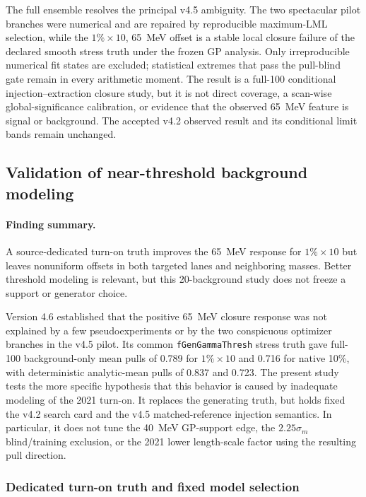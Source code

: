 \clearpage
The full ensemble resolves the principal v4.5 ambiguity.  The two spectacular pilot
branches were numerical and are repaired by reproducible maximum-LML selection, while
the $1\%\times10$, 65~MeV offset is a stable local closure failure of the declared
smooth stress truth under the frozen GP analysis.  Only irreproducible numerical fit
states are excluded; statistical extremes that pass the pull-blind gate remain in every
arithmetic moment.
The result is a full-100 conditional injection--extraction closure study, but it is
not direct \CLs{} coverage, a scan-wise global-significance calibration, or evidence
that the observed 65~MeV feature is signal or background.  The accepted v4.2 observed
result and its conditional limit bands remain unchanged.

\FloatBarrier

\subsection{Validation of near-threshold background modeling}
\label{sec:v4p7-near-threshold-background-modeling}

\paragraph{Finding summary.}
A source-dedicated turn-on truth improves the 65~MeV response for
$1\%\times10$ but leaves nonuniform offsets in both targeted lanes and neighboring
masses.  Better threshold modeling is relevant, but this 20-background study does
not freeze a support or generator choice.

Version 4.6 established that the positive 65~MeV closure response was not
explained by a few pseudoexperiments or by the two conspicuous optimizer
branches in the v4.5 pilot.  Its common \texttt{fGenGammaThresh} stress truth
gave full-100 background-only mean pulls of 0.789 for $1\%\times10$ and 0.716
for native 10\%, with deterministic analytic-mean pulls of 0.837 and 0.723.
The present study tests the more specific hypothesis that this behavior is
caused by inadequate modeling of the 2021 turn-on.  It replaces the generating
truth, but holds fixed the v4.2 search card and the v4.5 matched-reference
injection semantics.  In particular, it does not tune the 40~MeV GP-support
edge, the $2.25\sigma_m$ blind/training exclusion, or the 2021 lower
length-scale factor using the resulting pull direction.

\subsubsection{Dedicated turn-on truth and fixed model selection}

